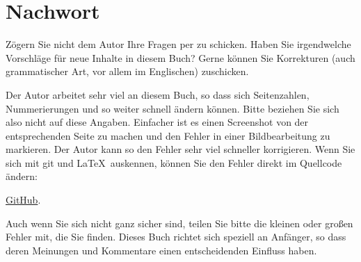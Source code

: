 \part*{Nachwort}


Zögern Sie nicht dem Autor Ihre Fragen per \GTT{<\EMAIL>} zu schicken.
Haben Sie irgendwelche Vorschläge für neue Inhalte in diesem Buch?
Gerne können Sie Korrekturen (auch grammatischer Art, vor allem im Englischen) zuschicken.

Der Autor arbeitet sehr viel an diesem Buch, so dass sich Seitenzahlen, Nummerierungen und so weiter
schnell ändern können. Bitte beziehen Sie sich also nicht auf diese Angaben.
Einfacher ist es einen Screenshot von der entsprechenden Seite zu machen und den Fehler in einer Bildbearbeitung
zu markieren. Der Autor kann so den Fehler sehr viel schneller korrigieren.
Wenn Sie sich mit git und \LaTeX\ auskennen, können Sie den Fehler direkt im Quellcode ändern:

\href{http://go.yurichev.com/17089}{GitHub}.

Auch wenn Sie sich nicht ganz sicher sind, teilen Sie bitte die kleinen oder großen Fehler mit, die Sie finden.
Dieses Buch richtet sich speziell an Anfänger, so dass deren Meinungen und Kommentare einen entscheidenden Einfluss haben.
